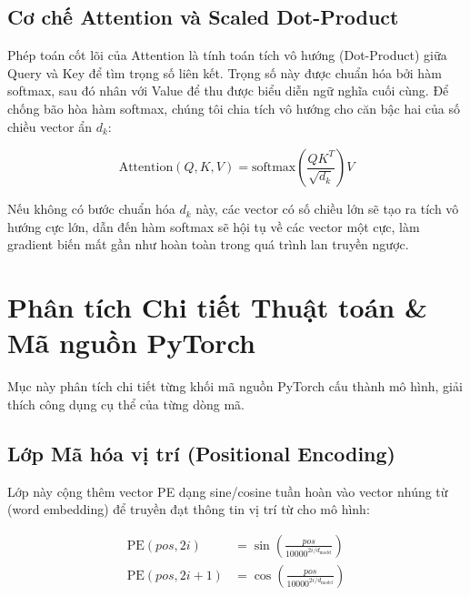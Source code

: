 \documentclass[12pt,a4paper]{report}
\begin{document}
\section{Cơ chế Attention và Scaled Dot-Product}

Phép toán cốt lõi của Attention là tính toán tích vô hướng (Dot-Product) giữa Query và Key để tìm trọng số liên kết. Trọng số này được chuẩn hóa bởi hàm softmax, sau đó nhân với Value để thu được biểu diễn ngữ nghĩa cuối cùng. Để chống bão hòa hàm softmax, chúng tôi chia tích vô hướng cho căn bậc hai của số chiều vector ẩn $d_k$:

\begin{equation}
\text{Attention}(Q, K, V) = \text{softmax}\left(\frac{Q K^T}{\sqrt{d_k}}\right) V
\end{equation}

Nếu không có bước chuẩn hóa $d_k$ này, các vector có số chiều lớn sẽ tạo ra tích vô hướng cực lớn, dẫn đến hàm softmax sẽ hội tụ về các vector một cực, làm gradient biến mất gần như hoàn toàn trong quá trình lan truyền ngược.

\newpage

\chapter{Phân tích Chi tiết Thuật toán \& Mã nguồn PyTorch}

Mục này phân tích chi tiết từng khối mã nguồn PyTorch cấu thành mô hình, giải thích công dụng cụ thể của từng dòng mã.

\section{Lớp Mã hóa vị trí (Positional Encoding)}

Lớp này cộng thêm vector PE dạng sine/cosine tuần hoàn vào vector nhúng từ (word embedding) để truyền đạt thông tin vị trí từ cho mô hình:

\begin{equation}
\begin{aligned}
\text{PE}(pos, 2i) &= \sin\left(\frac{pos}{10000^{2i/d_{\text{model}}}}\right) \\
\text{PE}(pos, 2i+1) &= \cos\left(\frac{pos}{10000^{2i/d_{\text{model}}}}\right)
\end{aligned}
\end{equation}
\end{document}
